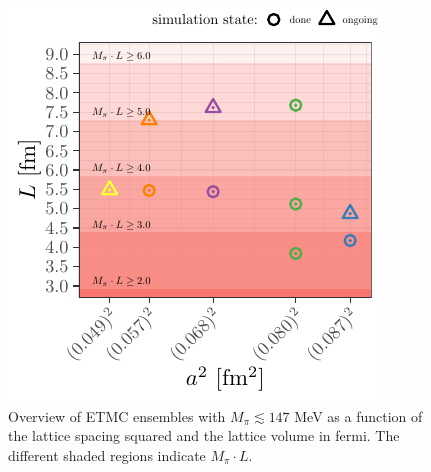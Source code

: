\documentclass[a4paper,11pt]{article}
\begin{document}
\begin{figure}
  \includegraphics[width=0.5\linewidth]{plots/ensembles_phys_point}
  \caption{Overview of ETMC ensembles with $M_\pi \lesssim 147$ MeV as a function of the lattice spacing squared and the lattice volume in fermi. The different shaded regions indicate $M_\pi \cdot L$.}
  \label{fig:ensembles_phys_point}
\end{figure}

\end{document}
